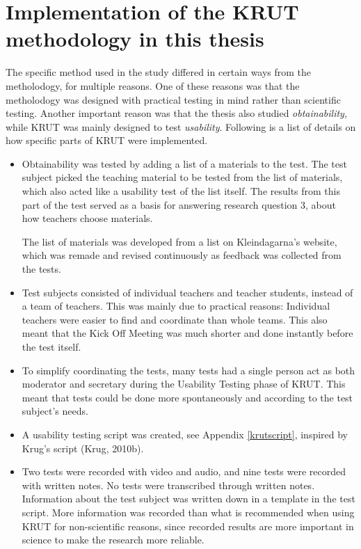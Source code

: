 \section{Implementation of the KRUT methodology in this thesis}
The specific method used in the study differed in certain ways from the metholodogy, for multiple reasons. One of these reasons was that the metholodogy was designed with practical testing in mind rather than scientific testing. Another important reason was that the thesis also studied \textit{obtainability}, while KRUT was mainly designed to test \textit{usability}. Following is a list of details on how specific parts of KRUT were implemented.

\begin{itemize}

\item Obtainability was tested by adding a list of a materials to the test. The test subject picked the teaching material to be tested from the list of materials, which also acted like a usability test of the list itself. The results from this part of the test served as a basis for answering research question 3, about how teachers choose materials.

The list of materials was developed from a list on Kleindagarna's website, which was remade and revised continuously as feedback was collected from the tests.

\item Test subjects consisted of individual teachers and teacher students, instead of a team of teachers. This was mainly due to practical reasons: Individual teachers were easier to find and coordinate than whole teams. This also meant that the Kick Off Meeting was much shorter and done instantly before the test itself.

\item To simplify coordinating the tests, many tests had a single person act as both moderator and secretary during the Usability Testing phase of KRUT. This meant that tests could be done more spontaneously and according to the test subject's needs.

\item A usability testing script was created, see Appendix \ref{krutscript}, inspired by Krug's script (Krug, 2010b).

\item Two tests were recorded with video and audio, and nine tests were recorded with written notes. No tests were transcribed through written notes. Information about the test subject was written down in a template in the test script. More information was recorded than what is recommended when using KRUT for non-scientific reasons, since recorded results are more important in science to make the research more reliable.


\end{itemize}
